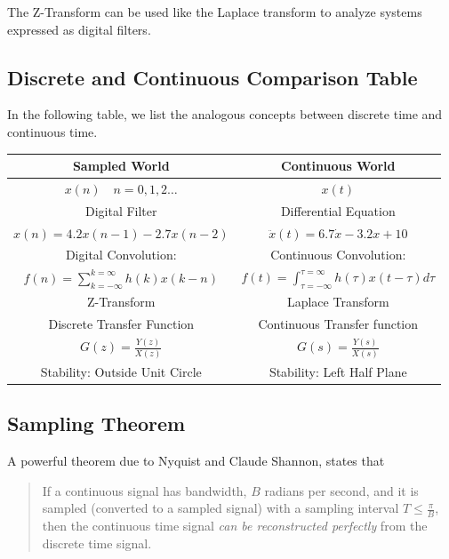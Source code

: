 The Z-Transform can be used like the Laplace transform to analyze systems expressed as digital filters.


\subsection{Discrete and Continuous Comparison Table}

In the following table, we list the analogous concepts between discrete time and continuous time.

\renewcommand\arraystretch{1.75}%
\begin{centering}
\begin{tabular}{c|c}
{\bf Sampled World  }         &  {\bf Continuous World  }   \\ \hline
$x(n) \quad n= 0,1,2 \dots$                  &     $x(t)$           \\
Digital Filter          &  Differential Equation   \\
$x(n) = 4.2x(n-1)-2.7x(n-2)$&   $\ddot{x}(t) = 6.7\dot{x} -3.2{x} + 10 $\\
Digital Convolution:         &   Continuous Convolution:    \\
  $f(n) = \sum_{k=-\infty}^{k=\infty} h(k)x(k-n)$  &
  $f(t) = \int_{\tau=-\infty}^{\tau=\infty} h(\tau)x(t-\tau) d\tau$  \\
Z-Transform             &  Laplace Transform   \\
Discrete Transfer Function  &  Continuous Transfer function   \\
$G(z) = \frac{Y(z)}{X(z)}$   &  $G(s) = \frac{Y(s)}{X(s)}$  \\
Stability:  Outside Unit Circle  & Stability: Left Half Plane   \\
\end{tabular}
\end{centering}


\subsection{Sampling Theorem}

A powerful theorem due to Nyquist and Claude Shannon, states that

\begin{quotation}
  If a continuous signal has bandwidth, $B$ radians per second, and it is sampled (converted to a sampled signal) with
a sampling interval
$T \leq  \frac{\pi}{B}$, then the continuous time signal {\it can be reconstructed perfectly} from the discrete time signal.
\end{quotation}

